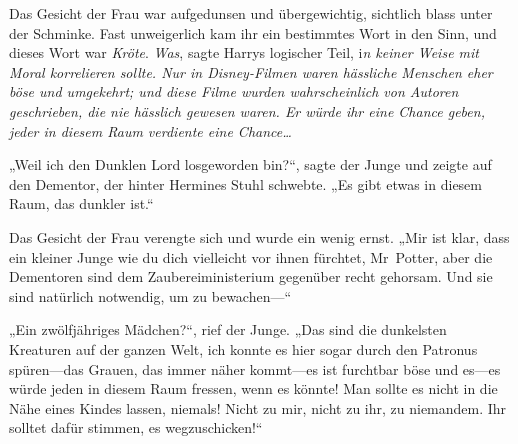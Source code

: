 Das Gesicht der Frau war aufgedunsen und übergewichtig, sichtlich blass unter der Schminke. Fast unweigerlich kam ihr ein bestimmtes Wort in den Sinn, und dieses Wort war \emph{Kröte}.
\emph{Was}, sagte Harrys logischer Teil, i\emph{n keiner Weise mit Moral korrelieren sollte. Nur in Disney-Filmen waren hässliche Menschen eher böse und umgekehrt; und diese Filme wurden wahrscheinlich von Autoren geschrieben, die nie hässlich gewesen waren. Er würde ihr eine Chance geben, jeder in diesem Raum verdiente eine Chance…}

„Weil ich den Dunklen Lord losgeworden bin?“, sagte der Junge und zeigte auf den Dementor, der hinter Hermines Stuhl schwebte. „Es gibt etwas in diesem Raum, das dunkler ist.“

Das Gesicht der Frau verengte sich und wurde ein wenig ernst.
„Mir ist klar, dass ein kleiner Junge wie du dich vielleicht vor ihnen fürchtet, Mr~Potter, aber die Dementoren sind dem Zaubereiministerium gegenüber recht gehorsam. Und sie sind natürlich notwendig, um zu bewachen—“

„Ein zwölfjähriges Mädchen?“, rief der Junge. „Das sind die dunkelsten Kreaturen auf der ganzen Welt, ich konnte es hier sogar durch den Patronus spüren—das Grauen, das immer näher kommt—es ist furchtbar böse und es—es würde jeden in diesem Raum fressen, wenn es könnte! Man sollte es nicht in die Nähe eines Kindes lassen, niemals! Nicht zu mir, nicht zu ihr, zu niemandem. Ihr solltet dafür stimmen, es wegzuschicken!“

